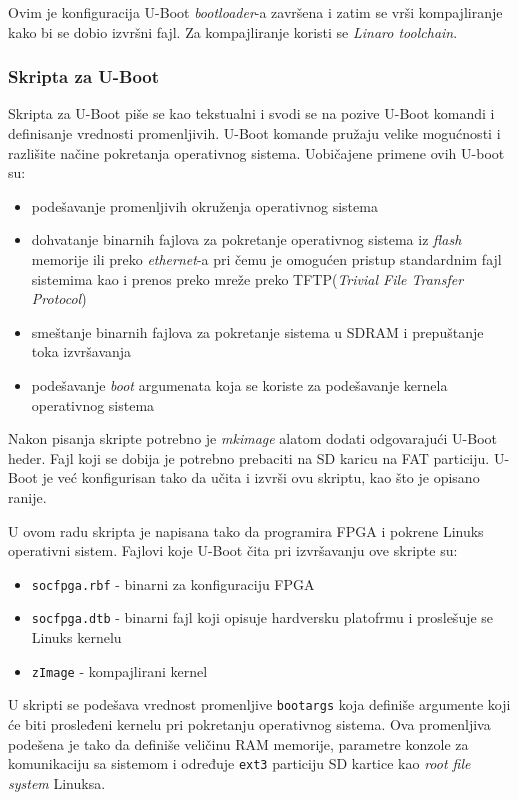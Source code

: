Ovim je konfiguracija U-Boot \textit{bootloader}-a završena i zatim se vrši kompajliranje kako bi se dobio izvršni fajl. Za kompajliranje koristi se \textit{Linaro toolchain}.
\subsubsection{Skripta za U-Boot}
Skripta za U-Boot piše se kao tekstualni i svodi se na pozive U-Boot komandi i definisanje vrednosti promenljivih. U-Boot komande pružaju velike mogućnosti i razlišite načine pokretanja operativnog sistema. Uobičajene primene ovih U-boot su:
\begin{itemize}
\item podešavanje promenljivih okruženja operativnog sistema
\item dohvatanje binarnih fajlova za pokretanje operativnog sistema iz \textit{flash} memorije ili preko \textit{ethernet}-a pri čemu je omogućen pristup standardnim fajl sistemima kao i prenos preko mreže preko TFTP(\textit{Trivial File Transfer Protocol})
\item smeštanje binarnih fajlova za pokretanje sistema u SDRAM i prepuštanje toka izvršavanja
\item podešavanje \textit{boot} argumenata koja se koriste za podešavanje kernela operativnog sistema
\end{itemize}

Nakon pisanja skripte potrebno je \textit{mkimage} alatom dodati odgovarajući U-Boot heder. Fajl koji se dobija je potrebno prebaciti na SD karicu na FAT particiju. U-Boot je već konfigurisan tako da učita i izvrši ovu skriptu, kao što je opisano ranije.

U ovom radu skripta je napisana tako da programira FPGA i pokrene Linuks operativni sistem. Fajlovi koje U-Boot čita pri izvršavanju ove skripte su:
\begin{itemize}
\item \texttt{socfpga.rbf} - binarni za konfiguraciju FPGA
\item \texttt{socfpga.dtb} - binarni fajl koji opisuje hardversku platofrmu i proslešuje se Linuks kernelu
\item \texttt{zImage} - kompajlirani kernel
\end{itemize}

U skripti se podešava vrednost promenljive \texttt{bootargs} koja definiše argumente koji će biti prosleđeni kernelu pri pokretanju operativnog sistema. Ova promenljiva podešena je tako da definiše veličinu RAM memorije, parametre konzole za komunikaciju sa sistemom i određuje \texttt{ext3} particiju SD kartice kao \textit{root file system} Linuksa.

